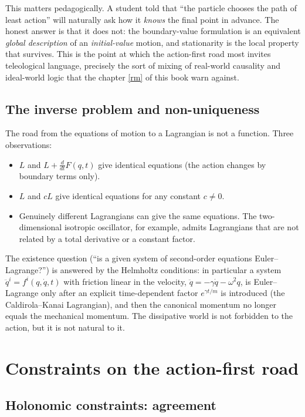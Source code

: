 This matters pedagogically. A student told that ``the particle chooses the
path of least action'' will naturally ask how it \emph{knows} the final point
in advance. The honest answer is that it does not: the boundary-value
formulation is an equivalent \emph{global description} of an \emph{initial-value}
motion, and stationarity is the local property that survives. This is the
point at which the action-first road most invites teleological language,
precisely the sort of mixing of real-world causality and ideal-world logic
that the  chapter \ref{rm} of this book warn against.

\subsection{The inverse problem and non-uniqueness}
\label{inverse}

The road from the equations of motion to a Lagrangian is not a function. Three
observations:
\begin{itemize}
  \item $L$ and $L+\frac{d}{dt}F(q,t)$ give identical equations (the action
  changes by boundary terms only).
  \item $L$ and $cL$ give identical equations for any constant $c\neq0$.
  \item Genuinely different Lagrangians can give the same equations. The
  two-dimensional isotropic oscillator, for example, admits Lagrangians that
  are not related by a total derivative or a constant factor.
\end{itemize}
The existence question (``is a given system of second-order equations
Euler--Lagrange?'') is answered by the Helmholtz conditions: in particular a
system $\ddot q^i=f^i(q,\dot q,t)$ with friction linear in the velocity,
$\ddot q=-\gamma\dot q-\omega^2q$, is Euler--Lagrange only after an explicit
time-dependent factor $e^{\gamma t/m}$ is introduced (the Caldirola--Kanai
Lagrangian), and then the canonical momentum no longer equals the mechanical
momentum. The dissipative world is not forbidden to the action, but it is not
natural to it.

\section{Constraints on the action-first road}
\label{constraints-variational}

\subsection{Holonomic constraints: agreement}

